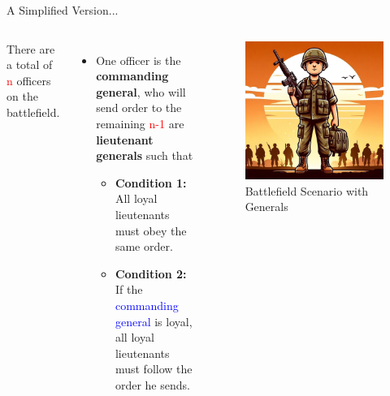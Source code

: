 \documentclass{beamer}
\begin{document}
\begin{frame}{A Simplified Version...}
    \begin{columns}
    \vspace{3cm}
         There are a total of \textcolor{red}{n} officers on the battlefield.
        \begin{itemize}
            \item One officer is the \textbf{commanding general}, who will send order to the remaining \textcolor{red}{n-1} are \textbf{lieutenant generals} such that
            \begin{itemize}
                \item \textbf{Condition 1:} All \textcolor{customgreen}{loyal} lieutenants must obey the same order.
                \item \textbf{Condition 2:} If the \textcolor{blue}{commanding general} is \textcolor{customgreen}{loyal}, all loyal lieutenants must follow the order he sends.
            \end{itemize}
        \end{itemize}
        \begin{figure}
            \includegraphics[width=\textwidth]{images2/army-8749314_1280.jpg}  %
            \caption{Battlefield Scenario with Generals}
        \end{figure}
    \end{columns}
\end{frame}
\end{document}
